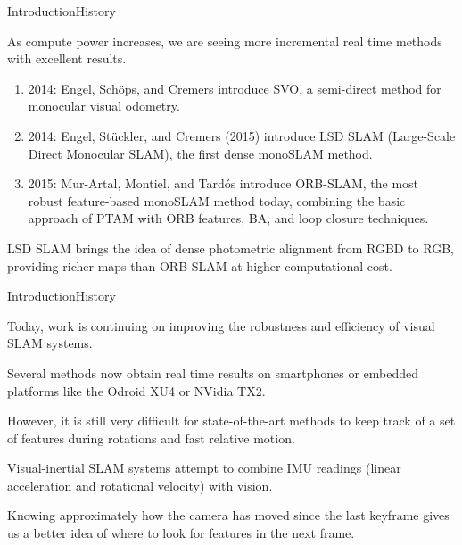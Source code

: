 \documentclass[aspectratio=169]{beamer}
\begin{document}
\begin{frame}{Introduction}{History}

  As compute power increases, we are seeing
  more incremental real time methods with excellent results.
  
  \begin{enumerate}
      \item 2014: Engel, Sch\"{o}ps, and Cremers introduce \alert{SVO}, a
      semi-direct method for monocular visual odometry.
    \item 2014: Engel, St\"{u}ckler, and Cremers (2015) introduce LSD
      SLAM (Large-Scale Direct Monocular SLAM), the first dense
      monoSLAM method.
    \item 2015: Mur-Artal, Montiel, and Tard\'{o}s introduce ORB-SLAM,
      the most robust feature-based monoSLAM method today, combining
      the basic approach of PTAM with ORB features, BA, and loop
      closure techniques.
  \end{enumerate}

  LSD SLAM brings the idea of dense photometric alignment from RGBD to
  RGB, providing richer maps than ORB-SLAM at higher computational
  cost.

\end{frame}


\begin{frame}{Introduction}{History}

  Today, work is continuing on improving the robustness and efficiency
  of visual SLAM systems.

  \medskip

  Several methods now obtain real time results on smartphones or embedded
  platforms like the Odroid XU4 or NVidia TX2.

  \medskip

  However, it is still very difficult for state-of-the-art methods to
  keep track of a set of features during rotations and fast relative
  motion.

  \medskip

  \alert{Visual-inertial SLAM} systems attempt to combine IMU readings
  (linear acceleration and rotational velocity) with vision.

  \medskip

  Knowing approximately how the camera has moved since the last keyframe
  gives us a better idea of where to look for features in the next frame.

\end{frame}
\end{document}
